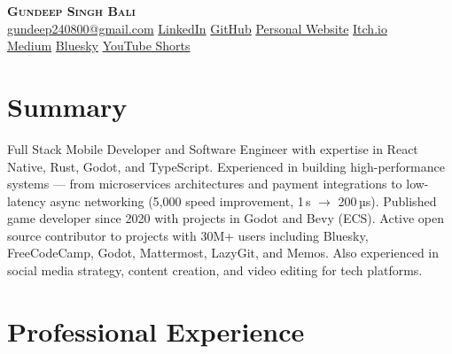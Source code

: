 \documentclass[11pt,letterpaper]{article}
\begin{document}
\begin{center}
  {\Huge\scshape\textbf{Gundeep Singh Bali}}\\[4pt]
  \small
  \faEnvelope\enspace\href{mailto:gundeep240800@gmail.com}{gundeep240800@gmail.com}
  \enspace\textbar\enspace
  \faLinkedinIn\enspace\href{https://linkedin.com/in/gundeep}{LinkedIn}
  \enspace\textbar\enspace
  \faGithub\enspace\href{https://github.com/gundeep}{GitHub}
  \enspace\textbar\enspace
  \faGlobe\enspace\href{https://gundeep.dev}{Personal Website}
  \enspace\textbar\enspace
  \faGamepad\enspace\href{https://gundeep.itch.io}{Itch.io}\\[2pt]
  \faMedium\enspace\href{https://medium.com/@gundeep}{Medium}
  \enspace\textbar\enspace
  \faTwitter\enspace\href{https://bsky.app/profile/gundeep}{Bluesky}
  \enspace\textbar\enspace
  \faYoutube\enspace\href{https://youtube.com/@gundeep}{YouTube Shorts}
\end{center}

\section{Summary}
\small{
Full Stack Mobile Developer and Software Engineer with expertise in React Native, Rust, Godot, and TypeScript.
Experienced in building high-performance systems — from microservices architectures and payment integrations
to low-latency async networking (5{,}000{\texttimes} speed improvement, 1\,s $\rightarrow$ 200\,µs).
Published game developer since 2020 with projects in Godot and Bevy (ECS). Active open source contributor
to projects with 30M+ users including Bluesky, FreeCodeCamp, Godot, Mattermost, LazyGit, and Memos.
Also experienced in social media strategy, content creation, and video editing for tech platforms.
}
\vspace{-4pt}

\section{Professional Experience}
\end{document}
